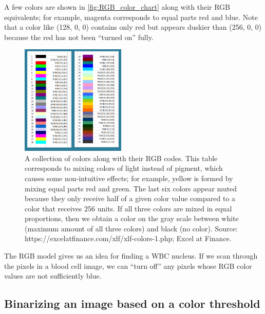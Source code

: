 A few colors are shown in \autoref{fig:RGB_color_chart} along with their RGB equivalents; for example, magenta corresponds to equal parts red and blue. Note that a color like (128, 0, 0) contains only red but appears duskier than (256, 0, 0) because the red has not been “turned on” fully.

\begin{figure}[h]
\centering
\mySfFamily
\includegraphics[width = 0.444\textwidth]{../images/RGB_color_chart.png}
\caption{A collection of colors along with their RGB codes. This table corresponds to mixing colors of light instead of pigment, which causes some non-intuitive effects; for example, yellow is formed by mixing equal parts red and green. The last six colors appear muted because they only receive half of a given color value compared to a color that receives 256 units. If all three colors are mixed in equal proportions, then we obtain a color on the gray scale between white (maximum amount of all three colors) and black (no color). Source: https://excelatfinance.com/xlf/xlf-colors-1.php; Excel at Finance.}
\label{fig:RGB_color_chart}
\end{figure}

The RGB model gives us an idea for finding a WBC nucleus. If we scan through the pixels in a blood cell image, we can “turn off” any pixels whose RGB color values are not sufficiently blue.

\begin{qbox}\end{qbox}

\FloatBarrier
{}
\subsection{Binarizing an image based on a color threshold}

